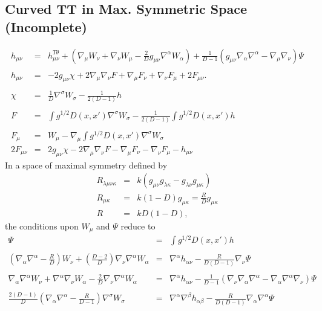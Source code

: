 \documentclass[10pt,letterpaper]{article}
\numberwithin{equation}{section}
\begin{document}
\subsection{Curved TT in Max. Symmetric Space (Incomplete)}
\begin{eqnarray}
h_{\mu\nu} &=& h_{\mu\nu}^{T\theta} + \left(\nabla_\mu W_\nu + \nabla_\nu W_\mu - \frac{2}{D}g_{\mu\nu}\nabla^\alpha W_\alpha\right) +\frac{1}{D-1}\left( g_{\mu\nu}\nabla_\alpha \nabla^\alpha - \nabla_\mu\nabla_\nu\right)\Psi
\\  \nonumber\\
h_{\mu\nu} &=& -2g_{\mu\nu}\chi + 2\nabla_\mu\nabla_\nu F + \nabla_\mu F_\nu + \nabla_\nu F_\mu + 2F_{\mu\nu}.
\\ \nonumber\\
\chi &=& \frac{1}{D}\nabla^\sigma W_{\sigma}  - \frac{1}{2(D-1)}h
\\ \nonumber\\
F &=& \int g^{1/2} D(x,x') \nabla^\sigma W_{\sigma}  - \frac{1}{2(D-1)}\int g^{1/2} D(x,x') h
\\ \nonumber\\
F_{\mu} &=& W_{\mu} -\nabla_\mu \int g^{1/2} D(x,x')\nabla^{\sigma}W_\sigma
\nonumber\\
2F_{\mu\nu} &=& 2g_{\mu\nu}\chi - 2\nabla_\mu\nabla_\nu F - \nabla_\mu F_\nu - \nabla_\nu F_{\mu} - h_{\mu\nu} 
\end{eqnarray}
In a space of maximal symmetry defined by
\begin{eqnarray}
R_{\lambda\mu\nu\kappa} &=& k(g_{\mu\nu}g_{\lambda\kappa}-g_{\lambda\nu}g_{\mu\kappa})
\nonumber\\
R_{\mu\kappa} &=& k(1-D)g_{\mu\kappa} = \frac{R}{D}g_{\mu\kappa}
\nonumber\\
R&=& kD(1-D), 
\end{eqnarray}
the conditions upon $W_\mu$ and $\Psi$ reduce to
\begin{eqnarray}
\Psi &=& \int g^{1/2} D(x,x') h
\\ \nonumber \\
\left(\nabla_\alpha\nabla^\alpha-\frac{R}{D}\right) W_\nu + \left(\frac{D-2}{D}\right)\nabla_\nu \nabla^\alpha W_\alpha  &=&
\nabla^\alpha h_{\alpha\nu} - \frac{R}{D(D-1)}\nabla_\nu \Psi
\\\nonumber \\
\nabla_\alpha \nabla^\alpha W_\nu +\nabla^\alpha \nabla_\nu W_\alpha - \frac{2}{D}\nabla_\nu\nabla^\alpha W_\alpha&=&
\nabla^\alpha h_{\alpha\nu} - \frac{1}{D-1}\left(\nabla_\nu \nabla_\alpha\nabla^\alpha - \nabla_\alpha\nabla^\alpha \nabla_\nu\right)
\Psi
\\ \nonumber\\
\frac{2(D-1)}{D}\left( \nabla_\alpha\nabla^\alpha -\frac{R}{D-1}\right) \nabla^\sigma W_\sigma &=& 
\nabla^\alpha\nabla^\beta h_{\alpha\beta}  - \frac{R}{D(D-1)}\nabla_\alpha \nabla^\alpha \Psi
\label{maxsymcon4}
\end{eqnarray}
\end{document}
